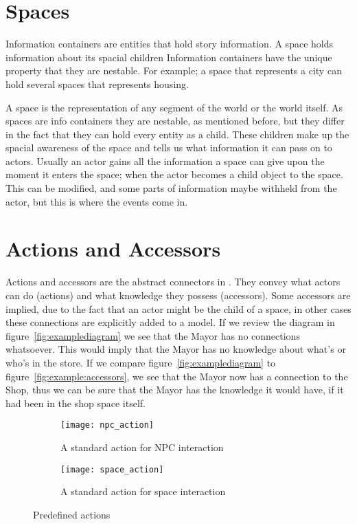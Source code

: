 \section{Spaces}
\label{sec:informationcontainers}
Information containers are entities that hold story information.
A space holds information about its spacial children Information containers have the unique property that they are nestable.
For example; a space that represents a city can hold several spaces that represents housing.


A space is the representation of any segment of the world or the world itself.
As spaces are info containers they are nestable, as mentioned before, but they differ in the fact that they can hold every entity as a child.
These children make up the spacial awareness of the space and tells us what information it can pass on to actors.
Usually an actor gains all the information a space can give upon the moment it enters the space; when the actor becomes a child object to the space.
This can be modified, and some parts of information maybe withheld from the actor, but this is where the events come in.

\section{Actions and Accessors}
\label{sec:actions_and_accessors}
Actions and accessors are the abstract connectors in \diage.
They convey what actors can do (actions) and what knowledge they possess (accessors).
Some accessors are implied, due to the fact that an actor might be the child of a space, in other cases these connections are explicitly added to a \diage model.
If we review the diagram in figure~\ref{fig:examplediagram} we see that the Mayor has no connections whatsoever.
This would imply that the Mayor has no knowledge about what's or who's in the store.
If we compare figure~\ref{fig:examplediagram} to figure~\ref{fig:example:accessors}, we see that the Mayor now has a connection to the Shop, thus we can be sure that the Mayor has the knowledge it would have, if it had been in the shop space itself.

\begin{figure}[p]
	\centering
	\begin{subfigure}[b]{0.3\textwidth}
		\texttt{[image: npc\_action]}
		\caption{A standard action for NPC interaction}\label{fig:actions:npc}
	\end{subfigure}
	\begin{subfigure}[b]{0.3\textwidth}
		\texttt{[image: space\_action]}
		\caption{A standard action for space interaction}\label{fig:actions:space}
	\end{subfigure}
	\caption{Predefined actions}\label{fig:actions}
\end{figure}

